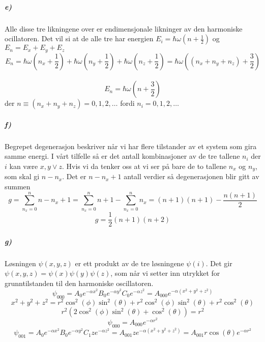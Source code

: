 \documentclass[11pt, A4paper,norsk]{article}
\begin{document}
			\subparagraph{e)}
				\begin{flushleft}
Alle disse tre likningene over er endimensjonale likninger av den harmoniske ocillatoren. Det vil si at de alle tre har energien $E_i = \hbar \omega \left( n + \frac{1}{2} \right)$ og $E_n = E_x + E_y + E_z$
$$E_n = \hbar \omega \left( n_x + \frac{1}{2} \right) + \hbar \omega \left( n_y + \frac{1}{2} \right) + \hbar \omega \left( n_z + \frac{1}{2} \right) = \hbar \omega \left( (n_x + n_y + n_z) + \frac{3}{2} \right)$$ \\
$$E_n = \hbar \omega \left( n + \frac{3}{2} \right)$$
der $n \equiv (n_x + n_y + n_z) = 0, 1, 2, \dots$ fordi $n_i = 0, 1, 2, \dots$
				\end{flushleft}









			\subparagraph{f)}
				\begin{flushleft}
Begrepet degenerasjon beskriver når vi har flere tilstander av et system som gira samme energi. I vårt tilfelle så er det antall kombinasjoner av de tre tallene $n_i$ der $i$ kan være $x, y \vee z$. Hvis vi da tenker oss at vi ser på bare de to tallene $n_x$ og $n_y$, som skal gi $n - n_x$. Det er $n - n_x + 1$ antall verdier så degenerasjonen blir gitt av summen
$$g = \sum_{n_x = 0}^{n} n - n_x + 1 = \sum_{n_x = 0}^{n} n + 1 - \sum_{n_x = 0}^{n} n_x = (n + 1)(n + 1) - \frac{n(n + 1)}{2}$$
$$g = \frac{1}{2} (n + 1)(n + 2)$$
				\end{flushleft}












			\subparagraph{g)}
				\begin{flushleft}
Løsningen $\psi(x, y, z)$ er ett produkt av de tre løsningene $\psi(i)$. Det gir $\psi(x, y, z) = \psi(x) \psi(y) \psi(z)$, som når vi setter inn utrykket for grunntilstanden til den harmoniske oscillatoren.
$$\psi_{000} = A_0e^{- \alpha x^2} B_0e^{- \alpha y^2} C_0e^{- \alpha z^2} = A_{000}e^{- \alpha(x^2 + y^2 + z^2)}$$
$$x^2 + y^2 + z^2 = r^2 \cos^2(\phi) \sin^2(\theta) + r^2 \cos^2(\phi) \sin^2(\theta) + r^2 \cos^2(\theta)$$
$$r^2(2 \cos^2(\phi) \sin^2(\theta) + \cos^2(\theta)) = r^2$$
$$\psi_{000} = A_{000} e^{- \alpha r^2}$$
$$\psi_{001} = A_0e^{- \alpha x^2} B_0e^{- \alpha y^2} C_1ze^{- \alpha z^2} = A_{001} z e^{- \alpha(x^2 + y^2 + z^2)} = A_{001} r \cos(\theta) e^{- \alpha r^2}$$
				\end{flushleft}
\end{document}
